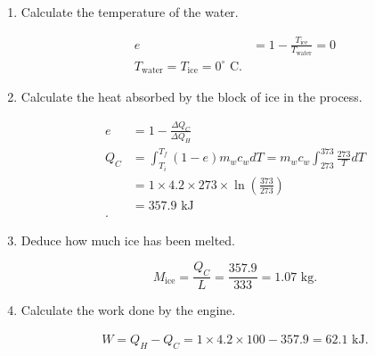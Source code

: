 \documentclass{zc-ust-hw}
\begin{document}
\begin{enumerate}
  \begin{enumerate}
    \item Calculate the temperature of the water. 
      \begin{sol}
        \begin{align}
          e&= 1-\frac{T_\text{ice}}{T_\text{water}}=0 \\
          T_\text{water} = T_\text{ice} = 0^{\circ}\text{ C} 
        .\end{align}
      \end{sol}
    \item Calculate the heat absorbed by the block of ice in the process. 
      \begin{sol}
        \begin{align}
          e &= 1-\frac{\Delta Q_C}{\Delta Q_H} \\
          Q_C&=\int_{T_i}^{T_f}(1-e)m_wc_wdT=m_wc_w\int_{273}^{373} \frac{273}{T}dT \\
          &= 1 \times 4.2 \times  273 \times \ln \left( \frac{373}{273} \right)  \\
          &= 357.9\text{ kJ} \\
        .\end{align}
      \end{sol}
    \item Deduce how much ice has been melted. 
      \begin{sol}
        \begin{equation}
          M_\text{ice} = \frac{Q_C}{L} = \frac{357.9}{333} = 1.07\text{ kg}
        .\end{equation}
      \end{sol}
    \item Calculate the work done by the engine. 
      \begin{sol}
        \begin{align*}
          W = Q_H - Q_C = 1 \times 4.2 \times 100 -357.9=62.1\text{ kJ}
        .\end{align*}
      \end{sol}
  \end{enumerate}

\end{enumerate}
\end{document}
